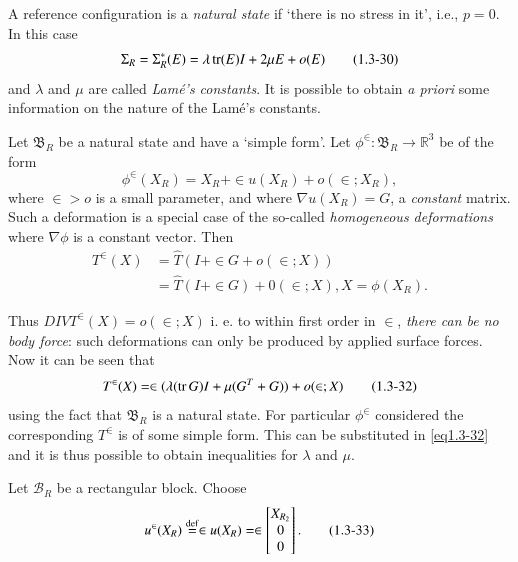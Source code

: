 A reference configuration is a \textit{natural state} if `there is no 
stress in it', i.e., $p = 0$. In this case 
\begin{equation*}
\Sigma_R = \Sigma^*_R(E) = \lambda \operatorname{tr}(E)I + 2 \mu E +
o(E)\tag{1.3-30}\label{eq1.3-30} 
\end{equation*}
and $\lambda$ and $\mu$ are called \textit{Lam\'e's
  constants}. It is
possible to obtain \textit{a priori} some information on the nature of
the Lam\'e's constants.

Let $\mathfrak{B}_R$ be a natural state and have a `simple form'. Let
$\phi^{\in} : \mathfrak{B}_R \to \mathbb{R}^3$ be of the form 
\begin{equation*}
\phi^{\in}(X_R) = X_R + \in u(X_R) + o(\in ; X_R),
\tag{1.3-31}\label{eq1.3-31} 
\end{equation*}
where $\in > o$ is a small parameter, and where $\nabla u (X_R)
= G$, a \textit{constant} matrix. Such a deformation is a special case
of the so-called \textit{homogeneous
  deformations}
where 
$\nabla \phi$ is a constant vector. Then 
\begin{align*}
T^{\in}(X) & = \hat{T}(I + \in G + o(\in ; X))\\
& = \hat{T}(I + \in G) + 0(\in ; X), X = \phi(X_R) . 
\end{align*}

Thus $DIV T^{\in}(X) = o(\in ; X)$ i. e. to within first order in
$\in$, \textit{there can be no body force}: such deformations can only
be produced by applied surface forces. Now it can be seen that  
\begin{equation*}
T^{\in}(X) = \in(\lambda(\operatorname{tr} G)I + \mu(G^T + G)) + o(\in
;X)\tag{1.3-32}\label{eq1.3-32} 
\end{equation*}\pageoriginale
using the fact that $\mathfrak{B}_R$ is a natural state. For
particular $\phi^\in$ considered the corresponding $T^\in$ is of some
simple form. This can be substituted in \eqref{eq1.3-32} and it is thus
possible to obtain inequalities for $\lambda$ and $\mu$.

\begin{experiment}\label{chap1-experiment1}%
  Let $\mathcal{B}_R$ be a rectangular block. Choose 
  \begin{equation*}
    u^\in (X_R) \overset{\operatorname{def}}{=} \in u (X_R) = \in 
    \begin{bmatrix}
      X_{R_2}\\
      0 \\
      0 \\
    \end{bmatrix}. 
    \tag{1.3-33}
  \end{equation*}
\end{experiment}

